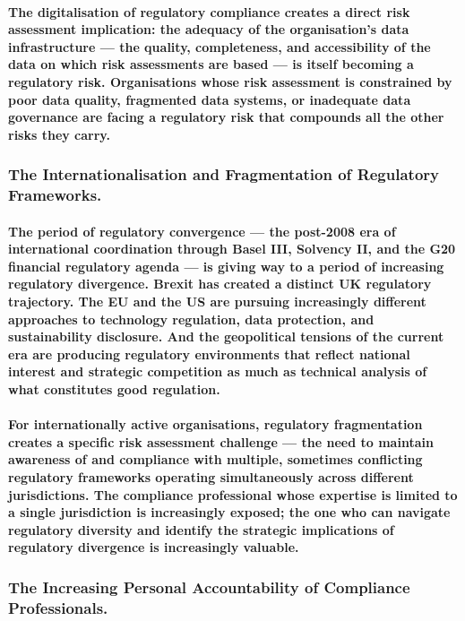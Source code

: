 \paragraph{The digitalisation of regulatory compliance creates a direct risk assessment implication: the adequacy of the organisation's data infrastructure — the quality, completeness, and accessibility of the data on which risk assessments are based — is itself becoming a regulatory risk. Organisations whose risk assessment is constrained by poor data quality, fragmented data systems, or inadequate data governance are facing a regulatory risk that compounds all the other risks they carry.}
\subsubsection{The Internationalisation and Fragmentation of Regulatory Frameworks.}
\paragraph{The period of regulatory convergence — the post-2008 era of international coordination through Basel III, Solvency II, and the G20 financial regulatory agenda — is giving way to a period of increasing regulatory divergence. Brexit has created a distinct UK regulatory trajectory. The EU and the US are pursuing increasingly different approaches to technology regulation, data protection, and sustainability disclosure. And the geopolitical tensions of the current era are producing regulatory environments that reflect national interest and strategic competition as much as technical analysis of what constitutes good regulation.}
\paragraph{For internationally active organisations, regulatory fragmentation creates a specific risk assessment challenge — the need to maintain awareness of and compliance with multiple, sometimes conflicting regulatory frameworks operating simultaneously across different jurisdictions. The compliance professional whose expertise is limited to a single jurisdiction is increasingly exposed; the one who can navigate regulatory diversity and identify the strategic implications of regulatory divergence is increasingly valuable.}
\subsubsection{The Increasing Personal Accountability of Compliance Professionals.}
